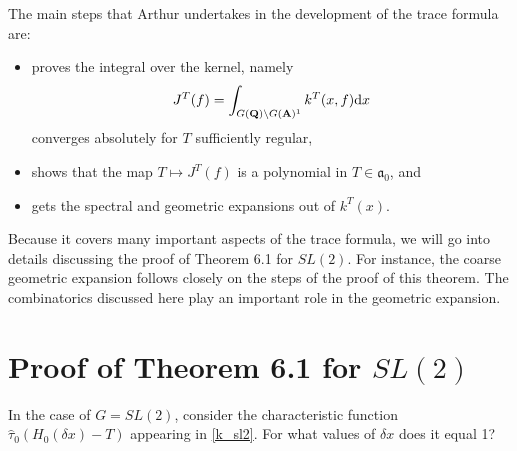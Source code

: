 \documentclass[11pt]{amsart}
\def\A{\mathbf A}
\def\Q{\mathbf Q}
\def\aaa{\mathfrak a}
\def\d{\text d}
\def\bs{\setminus}
\theoremstyle{remark}
\begin{document}
The main steps that Arthur undertakes in the development of the trace formula are:
\begin{itemize}
	\item proves the integral over the kernel, namely
			\[ J^T(f) = \int_{G(\Q) \bs G(\A)^1} k^T(x, f) \d x \]
			converges absolutely for $T$ sufficiently regular,
	\item shows that the map $T \mapsto J^T(f)$ is a polynomial in $T \in \aaa_0$, and
	\item gets the spectral and geometric expansions out of $k^T(x)$. 
\end{itemize}
Because it covers many important aspects of the trace formula, we will go into details discussing the proof of Theorem 6.1 for $SL(2)$. For instance, the coarse geometric expansion follows closely on the steps of the proof of this theorem. The combinatorics discussed here play an important role in the geometric expansion. 

\section{Proof of Theorem 6.1 for $SL(2)$} \label{6.1proof}

In the case of $G = SL(2)$, consider the characteristic function $\hat\tau_0(H_0(\delta x) - T)$ appearing in \cref{k_sl2}. For what values of $\delta x$ does it equal 1?
\end{document}
